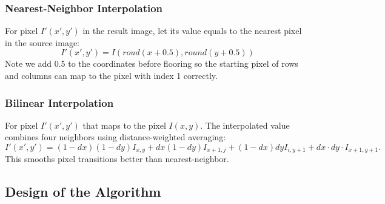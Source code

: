 \documentclass[a4paper,11pt]{article}
\begin{document}
\subsubsection{Nearest-Neighbor Interpolation}
    For pixel $I'(x', y')$ in the result image, let its value equals to the nearest pixel in the source image:
    \begin{equation}
        I'(x', y') = 
            I\left(roud(x + 0.5), round( y + 0.5 )\right)
        \label{eq:nn}
    \end{equation}
    Note we add 0.5 to the coordinates before flooring so the starting pixel of rows and columns can map to the pixel with index 1 correctly.

\subsubsection{Bilinear Interpolation}
    For pixel $I'(x', y')$ that maps to the pixel $I(x, y)$. The interpolated value combines four neighbors using distance-weighted averaging:
    \begin{equation}
        I'(x', y') = (1 - dx)(1 - dy)I_{x,y} + dx(1 - dy)I_{x+1,j} + (1 - dx)dyI_{i,y+1} + dx \cdot dy \cdot I_{x+1,y+1}.
        \label{eq:bilinear}
    \end{equation}
    This smooths pixel transitions better than nearest-neighbor.
    

\subsection{Design of the Algorithm}
\end{document}
